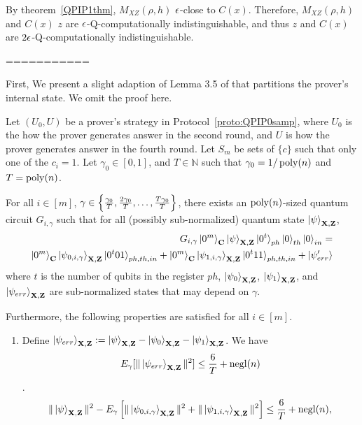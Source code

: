  By theorem~\ref{QPIP1thm}, $M_{XZ}(\rho,h)$  $\epsilon$-close to $C(x)$. Therefore, $M_{XZ}(\rho,h)$  and  $C(x)$ $z$ are $\epsilon$-Q-computationally indistinguishable, and thus $z$ and $C(x)$ are  $2\epsilon$-Q-computationally indistinguishable.
 
===========



First, We present a slight adaption of Lemma 3.5 of \cite{parallelrep}  that partitions the prover's internal state. We omit the proof here.


\begin{lemma}\label{lem:partition}
Let $(U_0,U)$ be a prover's strategy in Protocol~\ref{proto:QPIP0samp}, where $U_0$ is the how the prover generates answer in the second round, and $U$ is how the prover generates answer in the fourth round. Let $S_m$ be sets of $\{c\}$ such that only one of the $c_i=1$. Let $\gamma_0 \in[0,1]$, and $T\in \mathbb{N}$ such that $\gamma_0=1/\operatorname*{\operatorname{poly}}(n)$ and $T=\operatorname*{\operatorname{poly}}(n)$.

 For all $i\in[m]$, $\gamma \in \left\{\frac{\gamma_0}{T},\frac{2\gamma_0}{T},\dots,\frac{T\gamma_0}{T}\right\}$, there exists an $\operatorname*{\operatorname{poly}}(n)$-sized quantum circuit $G_{i,\gamma}$ such that for all (possibly sub-normalized)  quantum state $\ket{\psi}_{\mathbf{X},\mathbf{Z}}$,  
\begin{align*}
    G_{i,\gamma} \ket{0^m}_{\mathbf{C}}\ket{\psi}_{\mathbf{X},\mathbf{Z}}\ket{0^t}_{ph}\ket{0}_{th}\ket{0}_{in} = \\ \ket{0^m}_{\mathbf{C}}\ket{\psi_{0,i,\gamma}}_{\mathbf{X},\mathbf{Z}}\ket{0^t01}_{ph,th,in}+  \ket{0^m}_{\mathbf{C}}\ket{\psi_{1,i,\gamma}}_{\mathbf{X},\mathbf{Z}}\ket{0^t11}_{ph,th,in} + \ket{\psi'_{err}}
\end{align*}
 where $t$ is the number of qubits in the register $ph$, $\ket{\psi_0}_{\mathbf{X},\mathbf{Z}}$, $\ket{\psi_1}_{\mathbf{X},\mathbf{Z}}$, and $\ket{\psi_{err}}_{\mathbf{X},\mathbf{Z}}$ are sub-normalized states that may depend on $\gamma$.

Furthermore, the following properties are satisfied for all $i\in[m]$.
%
\begin{enumerate}
    \item \label{partition-property-1}  Define $\ket{\psi_{err}}_{\mathbf{X},\mathbf{Z}}:= \ket{\psi}_{\mathbf{X},\mathbf{Z}} - \ket{\psi_{0}}_{\mathbf{X},\mathbf{Z}}- \ket{\psi_{1}}_{\mathbf{X},\mathbf{Z}}$. We have  $$E_{\gamma}[\|\ket{\psi_{err}}_{\mathbf{X},\mathbf{Z}}\|^2]\leq \frac{6}{T}+\operatorname{negl}(n)$$. 
    $$\|\ket{\psi}_{\mathbf{X},\mathbf{Z}}\|^2 -E_{\gamma}\left[\|\ket{\psi_{0,i,\gamma}}_{\mathbf{X},\mathbf{Z}}\|^2 +\|\ket{\psi_{1,i,\gamma}}_{\mathbf{X},\mathbf{Z}}\|^2\right]\leq \frac{6}{T}+\operatorname{negl}(n),$$
    

\end{enumerate}
\end{lemma}
